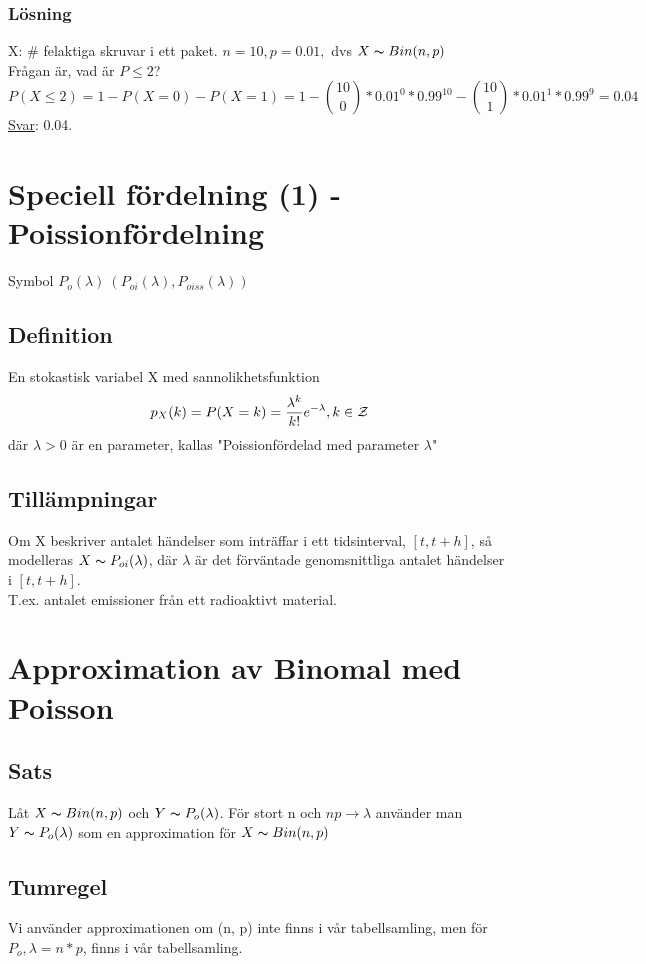 \documentclass{article}
\begin{document}
\subsubsection{Lösning}
X: \# felaktiga skruvar i ett paket. $n = 10, p = 0.01, $ dvs $X \thicksim Bin(n, p)$\\
Frågan är, vad är $P\le 2$?
$$ P(X\le 2) = 1-P(X=0)-P(X=1) = 1-{10 \choose 0}*0.01^0*0.99^{10}-{10 \choose 1}*0.01^1*0.99^9 = 0.04$$
\underline{Svar}: 0.04.

\section{Speciell fördelning (1) - Poissionfördelning}
Symbol $P_o(\lambda)\ (P_{oi}(\lambda), P_{oiss}(\lambda))$

\subsection{Definition}
En stokastisk variabel X med sannolikhetsfunktion
$$ p_X(k) = P(X=k) = \frac{\lambda^k}{k!}e^{-\lambda}, k\in\mathcal{Z} $$
där $\lambda> 0$ är en parameter, kallas "Poissionfördelad med parameter $\lambda$"

\subsection{Tillämpningar}
Om X beskriver antalet händelser som inträffar i ett tidsinterval, $\left[t, t+h \right]$, så modelleras $X\thicksim P_{oi}(\lambda)$, där $\lambda$ är det förväntade genomsnittliga antalet händelser i $\left[t, t+h \right]$.\\
T.ex. antalet emissioner från ett radioaktivt material.

\section{Approximation av Binomal med Poisson}
\subsection{Sats}
Låt $X\thicksim Bin(n, p)$ och $Y\thicksim P_o(\lambda)$. För stort n och $np\rightarrow \lambda$ använder man $Y\thicksim P_o(\lambda)$ som en approximation för $X\thicksim Bin(n, p)$

\subsection{Tumregel}
Vi använder approximationen om (n, p) inte finns i vår tabellsamling, men för $P_o, \lambda=n*p$, finns i vår tabellsamling.
\end{document}

